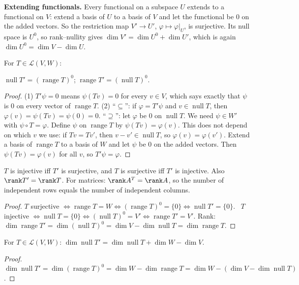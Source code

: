 \documentclass[10pt]{scrartcl}
\DeclareMathOperator{\nul}{null}
\DeclareMathOperator{\range}{range}
\newcommand{\LL}{\mathcal L}
\begin{document}
\textbf{Extending functionals.} Every functional on a subspace $U$ extends to a functional on $V$: extend a basis of $U$ to a basis of $V$ and let the functional be $0$ on the added vectors. So the restriction map $V'\to U'$, $\varphi\mapsto\varphi|_U$, is surjective. Its null space is $U^0$, so rank--nullity gives $\dim V'=\dim U^0+\dim U'$, which is again $\dim U^0=\dim V-\dim U$.

\begin{proposition*}
  For $T\in\LL(V,W)$:
  \begin{enumerate}
    \ii $\nul T'=(\range T)^0$;
    \ii $\range T'=(\nul T)^0$.
  \end{enumerate}
\end{proposition*}
\begin{proof}
  (1) $T'\psi=0$ means $\psi(Tv)=0$ for every $v\in V$, which says exactly that $\psi$ is $0$ on every vector of $\range T$.
  (2) ``$\subseteq$'': if $\varphi=T'\psi$ and $v\in\nul T$, then $\varphi(v)=\psi(Tv)=\psi(0)=0$.
  ``$\supseteq$'': let $\varphi$ be $0$ on $\nul T$. We need $\psi\in W'$ with $\psi\circ T=\varphi$. Define $\psi$ on $\range T$ by $\psi(Tv)=\varphi(v)$. This does not depend on which $v$ we use: if $Tv=Tv'$, then $v-v'\in\nul T$, so $\varphi(v)=\varphi(v')$. Extend a basis of $\range T$ to a basis of $W$ and let $\psi$ be $0$ on the added vectors. Then $\psi(Tv)=\varphi(v)$ for all $v$, so $T'\psi=\varphi$.
\end{proof}

\begin{corollary*}
  $T$ is injective iff $T'$ is surjective, and $T$ is surjective iff $T'$ is injective. Also $\rank T'=\rank T$. For matrices: $\rank A^T=\rank A$, so the number of independent rows equals the number of independent columns.
\end{corollary*}
\begin{proof}
  $T$ surjective $\iff\range T=W\iff(\range T)^0=\{0\}\iff\nul T'=\{0\}$. \ $T$ injective $\iff\nul T=\{0\}\iff(\nul T)^0=V'\iff\range T'=V'$.
  Rank: $\dim\range T'=\dim(\nul T)^0=\dim V-\dim\nul T=\dim\range T$.
\end{proof}

\begin{corollary*}[LADR 3.128(b)]
  For $T\in\LL(V,W)$: $\dim\nul T'=\dim\nul T+\dim W-\dim V$.
\end{corollary*}
\begin{proof}
  $\dim\nul T'=\dim(\range T)^0=\dim W-\dim\range T=\dim W-(\dim V-\dim\nul T)$.
\end{proof}
\end{document}
